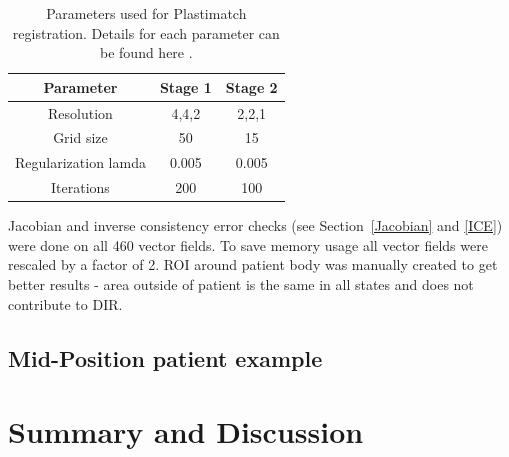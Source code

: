 \documentclass[type=dr, dr=rernat, accentcolor=tud7b,colorbacktitle, bigchapter, openright, twoside, 12pt ]{tudthesis}
\begin{document}
\begin{table}[H]
  \centering
  \caption{Parameters used for Plastimatch registration. Details for each parameter can be found here \cite{Plastimatch}.}
  \begin{tabular}{c|c|c}
      Parameter & Stage 1 & Stage 2 \\
      \hline
      Resolution & 4,4,2 & 2,2,1 \\
      Grid size & 50 & 15 \\
      Regularization lamda & 0.005 & 0.005 \\
      Iterations & 200 & 100 \\
    \hline\hline
  \end{tabular}
  \label{tab:stages2}
\end{table}

Jacobian and inverse consistency error checks (see Section~\ref{Jacobian} and \ref{ICE}) were done on all 460 vector fields. To save memory usage all vector fields were rescaled by a factor of 2. ROI around patient body was manually created to
get better results - area outside of patient is the same in all states and does not contribute to DIR.

\subsection{Mid-Position patient example}


\section{Summary and Discussion}





{}
% 
\end{document}
